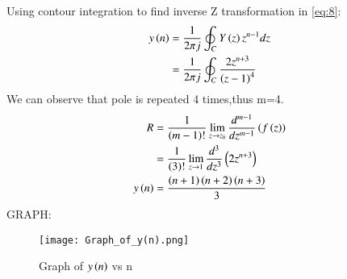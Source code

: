 \documentclass[journal,12pt,twocolumn]{IEEEtran}
\theoremstyle{remark}
\begin{document}
Using contour integration to find inverse Z transformation in \eqref{eq:8}:
\begin{align}
     y\left(n\right) & =  \frac{1}{2\pi j} \oint_C Y\left(z\right) z^{n-1} dz\label{eq:9}\\
   &=\frac{1}{2\pi j}\oint_{C}\frac{2z^{n+3}}{\left(z-1\right)^4}\label{eq:10}
\end{align}
We can observe that pole is repeated 4 times,thus m=4.
\begin{align}
 R&=\frac{1}{\left(m-1\right)!}\lim\limits_{z\to z_{0}}\frac{d^{m-1}}{dz^{m-1}}\left(f\left(z\right)\right)\label{eq:11}\\
 &=\frac{1}{\left(3\right)!}\lim\limits_{z\to 1}\frac{d^{3}}{dz^{3}}\left(2z^{n+3}\right)\label{eq:12}\\
 y\left(n\right)&=\frac{\left(n+1\right)\left(n+2\right)\left(n+3\right)}{3}\label{eq:13}
\end{align}
GRAPH:
\begin{figure}[h]
        \centering
\texttt{[image: Graph\_of\_y(n).png]}
\caption{Graph of $y\left(n\right)$ vs n}
\label{fig:enter-label}
\end{figure}
\end{document}
